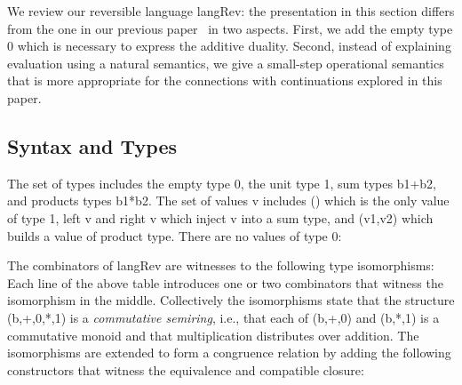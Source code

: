 \documentclass[preprint]{sigplanconf}
\begin{document}
We review our reversible language {{langRev}}: the presentation in this
section differs from the one in our previous paper~\cite{infeffects} in two
aspects. First, we add the empty type $0$ which is necessary to express the
additive duality. Second, instead of explaining evaluation using a natural
semantics, we give a small-step operational semantics that is more
appropriate for the connections with continuations explored in this paper.

\subsection{Syntax and Types} 
\label{sec:pi-syntax}

The set of types includes the empty type {{0}}, the unit type {{1}}, sum
types {{b1+b2}}, and products types {{b1*b2}}. The set of values {{v}}
includes {{()}} which is the only value of type {{1}}, {{left v}} and {{right v}} 
which inject {{v}} into a sum type, and {{(v1,v2)}} which builds a
value of product type. There are no values of type {{0}}:

The combinators of {{langRev}} are witnesses to the following type
isomorphisms: 
Each line of the above table introduces one or two combinators that witness
the isomorphism in the middle. Collectively the isomorphisms state that the
structure {{(b,+,0,*,1)}} is a \emph{commutative semiring}, i.e., that each
of {{(b,+,0)}} and {{(b,*,1)}} is a commutative monoid and that
multiplication distributes over addition. The isomorphisms are extended to
form a congruence relation by adding the following constructors that witness
the equivalence and compatible closure:
%
%
%
\end{document}
